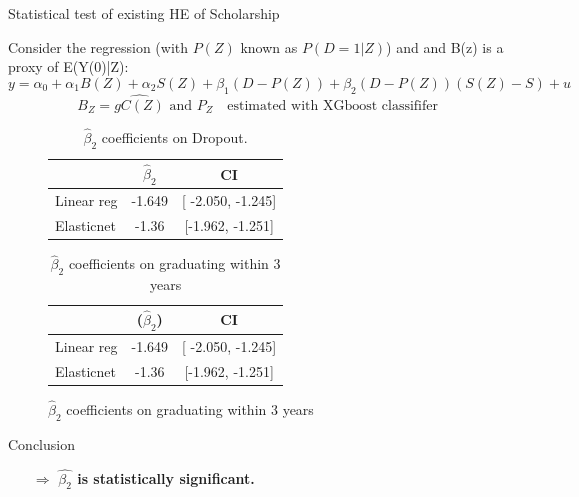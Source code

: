 \documentclass[aspectratio=169]{beamer}
\begin{document}
\begin{frame}{ Statistical test of existing HE of Scholarship}

Consider the regression (with \( P(Z) \) known as \( P(D = 1 | Z) \)) and and B(z) is a proxy of E(Y(0)|Z):
\[
y = \alpha_0 + \alpha_1 B(Z) + \alpha_2 S(Z) + \beta_1 (D - P(Z)) + \beta_2 (D - P(Z))(S(Z) - S) + u
\]
\[ B_Z = \hat{gC(Z)}  \text{ and }  P_Z  \text{  }   \text{ estimated with XGboost classififer }\]


\begin{figure}[h!]
    \begin{minipage}[b]{0.45\textwidth}
        
       \begin{table}[h]
    \centering
    \begin{tabular}{l c c}
        \hline
        & \textbf{\(\hat\beta_2\) } & \textbf{CI} \\
        \hline
        Linear reg & -1.649 & [ -2.050, -1.245] \\
        Elasticnet & -1.36 & [-1.962, -1.251] \\
        \hline
    \end{tabular}
    \caption{ \(\hat\beta_2\) coefficients on Dropout.}
    \label{tab:beta2_estimates}
\end{table}
    \end{minipage}
    \hspace{0.05\textwidth}
    \begin{minipage}[b]{0.45\textwidth}
        \begin{table}[h]
    \centering
    \begin{tabular}{l c c}
        \hline
        & \textbf{ (\(\hat\beta_2\))} & \textbf{CI} \\
        \hline
        Linear reg & -1.649 & [ -2.050, -1.245] \\
        Elasticnet & -1.36 & [-1.962, -1.251] \\
        \hline
    \end{tabular}
    \caption{ \(\hat \beta_2\) coefficients on graduating within 3 years}
    \label{tab:beta2_estimates}
\end{table}
       
    \end{minipage}

 \end{figure}  

 \begin{exampleblock}{Conclusion}
\vspace{-1pt}
\begin{itemize}
    \item [$\Rightarrow$]
\textbf{ \(\hat{\beta_2}\) is statistically significant.}
\end{itemize}
\vspace{-3pt}
	
\end{exampleblock}

\end{frame}
\end{document}
